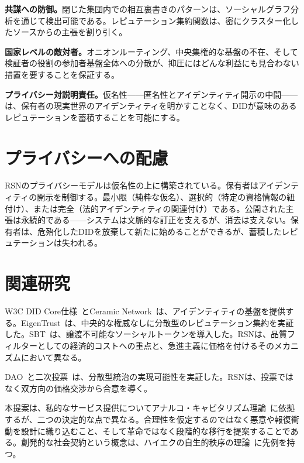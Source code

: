 \documentclass[11pt,a4paper,twocolumn]{article}
\begin{document}
\textbf{共謀への防御。}閉じた集団内での相互裏書きのパターンは、ソーシャルグラフ分析を通じて検出可能である。レピュテーション集約関数は、密にクラスター化したソースからの主張を割り引く。

\textbf{国家レベルの敵対者。}オニオンルーティング、中央集権的な基盤の不在、そして検証者の役割の参加者基盤全体への分散が、抑圧にはどんな利益にも見合わない措置を要することを保証する。

\textbf{プライバシー対説明責任。}仮名性——匿名性とアイデンティティ開示の中間——は、保有者の現実世界のアイデンティティを明かすことなく、DIDが意味のあるレピュテーションを蓄積することを可能にする。

\section{プライバシーへの配慮}

RSNのプライバシーモデルは仮名性の上に構築されている。保有者はアイデンティティの開示を制御する。最小限（純粋な仮名）、選択的（特定の資格情報の紐付け）、または完全（法的アイデンティティの関連付け）である。公開された主張は永続的である——システムは文脈的な訂正を支えるが、消去は支えない。保有者は、危殆化したDIDを放棄して新たに始めることができるが、蓄積したレピュテーションは失われる。

\section{関連研究}

W3C DID Core仕様~\cite{did2022}とCeramic Network~\cite{ceramic2023}は、アイデンティティの基盤を提供する。EigenTrust~\cite{kamvar2003}は、中央的な権威なしに分散型のレピュテーション集約を実証した。SBT~\cite{weyl2022}は、譲渡不可能なソーシャルトークンを導入した。RSNは、品質フィルターとしての経済的コストへの重点と、急進主義に価格を付けるそのメカニズムにおいて異なる。

DAO~\cite{buterin2014}と二次投票~\cite{buterin2019}は、分散型統治の実現可能性を実証した。RSNは、投票ではなく双方向の価格交渉から合意を導く。

本提案は、私的なサービス提供についてアナルコ・キャピタリズム理論~\cite{rothbard1973,hoppe2001}に依拠するが、二つの決定的な点で異なる。合理性を仮定するのではなく悪意や報復衝動を設計に織り込むこと、そして革命ではなく段階的な移行を提案することである。創発的な社会契約という概念は、ハイエクの自生的秩序の理論~\cite{hayek1973}に先例を持つ。
\end{document}
